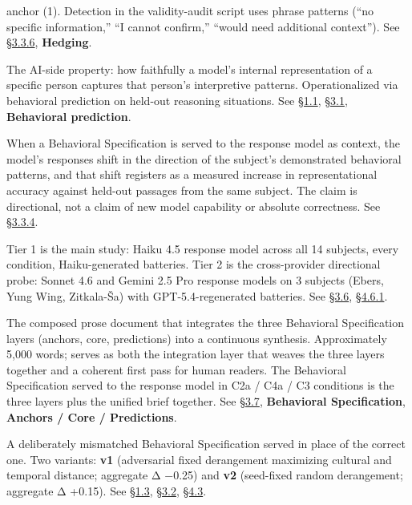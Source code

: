 \begin{description}
anchor (1). Detection in the validity-audit script uses phrase patterns
(``no specific information,'' ``I cannot confirm,'' ``would need
additional context''). See \hyperref[rubric-handling-limitations-post-hoc-validity-audit]{§3.3.6}, \textbf{Hedging}.
\item[Representational accuracy]
The AI-side property: how faithfully a model's internal representation
of a specific person captures that person's interpretive patterns.
Operationalized via behavioral prediction on held-out reasoning
situations. See \hyperref[recall-is-not-interpretation.-interpretation-can-be-measured.]{§1.1}, \hyperref[operationalizing-representational-accuracy-via-the-behavioral-specification]{§3.1}, \textbf{Behavioral prediction}.
\item[Specification-effect claim]
When a Behavioral Specification is served to the response model as
context, the model's responses shift in the direction of the subject's
demonstrated behavioral patterns, and that shift registers as a measured
increase in representational accuracy against held-out passages from the
same subject. The claim is directional, not a claim of new model
capability or absolute correctness. See \hyperref[inter-judge-agreement]{§3.3.4}.
\item[Tier 1 / Tier 2]
Tier 1 is the main study: Haiku 4.5 response model across all 14
subjects, every condition, Haiku-generated batteries. Tier 2 is the
cross-provider directional probe: Sonnet 4.6 and Gemini 2.5 Pro response
models on 3 subjects (Ebers, Yung Wing, Zitkala-Ša) with
GPT-5.4-regenerated batteries. See \hyperref[response-models]{§3.6}, \hyperref[cross-provider-response-generation-tier-2-replication]{§4.6.1}.
\item[Unified brief]
The composed prose document that integrates the three Behavioral
Specification layers (anchors, core, predictions) into a continuous
synthesis. Approximately 5,000 words; serves as both the integration
layer that weaves the three layers together and a coherent first pass
for human readers. The Behavioral Specification served to the response
model in C2a / C4a / C3 conditions is the three layers plus the unified
brief together. See \hyperref[pipeline-for-the-behavioral-specification]{§3.7}, \textbf{Behavioral Specification},
\textbf{Anchors / Core / Predictions}.
\item[Wrong-Spec control]
A deliberately mismatched Behavioral Specification served in place of
the correct one. Two variants: \textbf{v1} (adversarial fixed
derangement maximizing cultural and temporal distance; aggregate Δ
−0.25) and \textbf{v2} (seed-fixed random derangement; aggregate Δ
+0.15). See \hyperref[what-we-found]{§1.3}, \hyperref[experimental-conditions]{§3.2}, \hyperref[mechanism-correct-content-not-format]{§4.3}.
\end{description}

